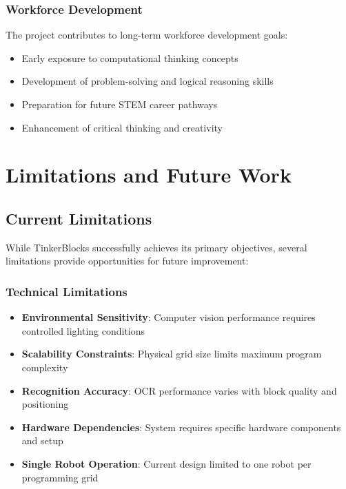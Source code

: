 \subsubsection{Workforce Development}

The project contributes to long-term workforce development goals:

\begin{itemize}
    \item Early exposure to computational thinking concepts
    \item Development of problem-solving and logical reasoning skills
    \item Preparation for future STEM career pathways
    \item Enhancement of critical thinking and creativity
\end{itemize}

\section{Limitations and Future Work}

\subsection{Current Limitations}

While TinkerBlocks successfully achieves its primary objectives, several limitations provide opportunities for future improvement:

\subsubsection{Technical Limitations}

\begin{itemize}
    \item \textbf{Environmental Sensitivity}: Computer vision performance requires controlled lighting conditions
    \item \textbf{Scalability Constraints}: Physical grid size limits maximum program complexity
    \item \textbf{Recognition Accuracy}: OCR performance varies with block quality and positioning
    \item \textbf{Hardware Dependencies}: System requires specific hardware components and setup
    \item \textbf{Single Robot Operation}: Current design limited to one robot per programming grid
\end{itemize}

